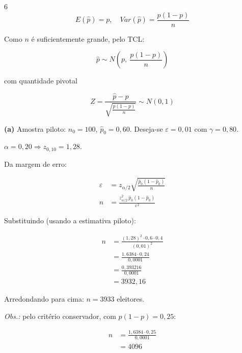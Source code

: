 \documentclass[8pt, a4paper, landscape]{extarticle}
\begin{document}
\begin{multicols}{6}
\begin{equation*}
E(\hat{p}) = p, \quad Var(\hat{p}) = \frac{p(1-p)}{n}
\end{equation*}

Como $n$ é suficientemente grande, pelo TCL:

\begin{equation*}
\hat{p} \sim N\left(p,\ \frac{p(1-p)}{n}\right)
\end{equation*}

com quantidade pivotal

\begin{equation*}
Z = \frac{\hat{p} - p}{\sqrt{\frac{p(1-p)}{n}}} \sim N(0,1)
\end{equation*}

\vspace{0.2cm}

\textbf{(a)} Amostra piloto: $n_0 = 100$, $\hat{p}_0 = 0,60$. Deseja-se $\varepsilon = 0,01$ com $\gamma = 0,80$.

$\alpha = 0,20 \Rightarrow z_{0,10} = 1,28$.

Da margem de erro:

\begin{equation*}
\begin{split}
\varepsilon &= z_{\alpha/2}\sqrt{\frac{\hat{p}_0(1-\hat{p}_0)}{n}} \\
n &= \frac{z_{\alpha/2}^2\,\hat{p}_0(1-\hat{p}_0)}{\varepsilon^2}
\end{split}
\end{equation*}

Substituindo (usando a estimativa piloto):

\begin{equation*}
\begin{split}
n &= \frac{(1,28)^2 \cdot 0,6 \cdot 0,4}{(0,01)^2} \\
&= \frac{1,6384 \cdot 0,24}{0,0001} \\
&= \frac{0,393216}{0,0001} \\
&= 3932,16
\end{split}
\end{equation*}

Arredondando para cima: $n = 3933$ eleitores.

\textit{Obs.:} pelo critério conservador, com $p(1-p) = 0,25$:

\begin{equation*}
\begin{split}
n &= \frac{1,6384 \cdot 0,25}{0,0001} \\
&= 4096
\end{split}
\end{equation*}


\end{multicols}
\end{document}
